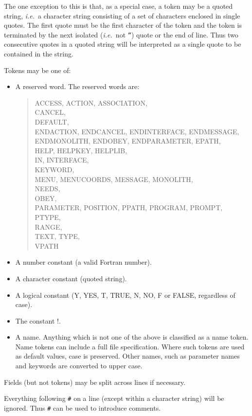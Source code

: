\documentclass[twoside,11pt,nolof]{starlink}
\begin{document}
The one exception to this is that, as a special case, a token may be a
quoted string, \emph{i.e.}\ a character string consisting of a set of characters
enclosed in single quotes.
The first quote must be the first
character of the token and the token is terminated by the next isolated
(\emph{i.e.}\ not \texttt{''}) quote or the end of line.
Thus two consecutive quotes in a quoted string will be interpreted as a single
quote to be contained in the string.

Tokens may be one of:
\begin{itemize}
\item A reserved word. The reserved words are:
\begin{quote}
ACCESS,
ACTION,
ASSOCIATION,\\
CANCEL,\\
DEFAULT,\\
ENDACTION,
ENDCANCEL,
ENDINTERFACE,
ENDMESSAGE,\\
ENDMONOLITH,
ENDOBEY,
ENDPARAMETER,
EPATH,\\
HELP,
HELPKEY,
HELPLIB,\\
IN,
INTERFACE,\\
KEYWORD,\\
MENU,
MENUCOORDS,
MESSAGE,
MONOLITH,\\
NEEDS,\\
OBEY,\\
PARAMETER,
POSITION,
PPATH,
PROGRAM,
PROMPT,
PTYPE,\\
RANGE,\\
TEXT,
TYPE,\\
VPATH
\end{quote}
\item A number constant (a valid Fortran number).
\item A character constant (quoted string).
\item A logical constant (Y, YES, T, TRUE, N, NO, F or FALSE, regardless of
case).
\item The constant !.
\item A name. Anything which is not one of the above is classified as a name
token.
Name tokens can include a full file specification. Where such tokens are
used as default values, case is preserved. Other names, such as parameter names
and keywords are converted to upper case.
\end{itemize}
Fields (but not tokens) may be split across lines if necessary.

Everything following \texttt{\#} on a line (except within a character
string) will be ignored.
Thus  \texttt{\#} can be used to introduce comments.
\end{document}
